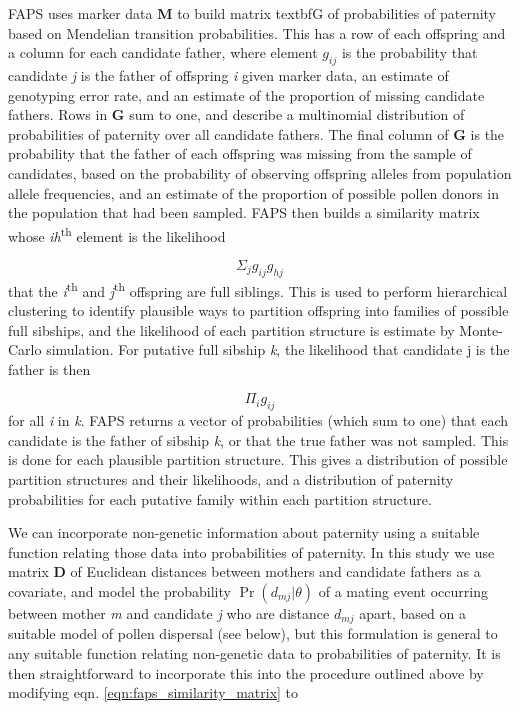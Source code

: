 \documentclass[10pt, a4paper, twocolumn]{article} %
\begin{document}
FAPS uses marker data \textbf{M} to build matrix textbf{G} of probabilities of paternity based on Mendelian transition probabilities. This has a row of each offspring and a column for each candidate father, where element $g_{ij}$ is the probability that candidate \textit{j} is the father of offspring \textit{i} given marker data, an estimate of genotyping error rate, and an estimate of the proportion of missing candidate fathers. Rows in \textbf{G} sum to one, and describe a multinomial distribution of probabilities of paternity over all candidate fathers. The final column of \textbf{G} is the probability that the father of each offspring was missing from the sample of candidates, based on the probability of observing offspring alleles from population allele frequencies, and an estimate of the proportion of possible pollen donors in the population that had been sampled. FAPS then builds a similarity matrix whose \textit{ih}\textsuperscript{th} element is the likelihood 

\begin{equation}\label{eqn:faps_similarity_matrix}
\Sigma_j g_{ij}g_{hj}
\end{equation}
that the \textit{i}\textsuperscript{th} and \textit{j}\textsuperscript{th} offspring are full siblings. This is used to perform hierarchical clustering to identify plausible ways to partition offspring into families of possible full sibships, and the likelihood of each partition structure is estimate by Monte-Carlo simulation. For putative full sibship \textit{k}, the likelihood that candidate j is the father is then

\begin{equation}\label{eqn:faps_lik_sibship}
\Pi_i g_{ij}
\end{equation}
for all \textit{i} in \textit{k}. FAPS returns a vector of probabilities (which sum to one) that each candidate is the father of sibship \textit{k}, or that the true father was not sampled. This is done for each plausible partition structure. This gives a distribution of possible partition structures and their likelihoods, and a distribution of paternity probabilities for each putative family within each partition structure.

We can incorporate non-genetic information about paternity using a suitable function relating those data into probabilities of paternity. In this study we use matrix \textbf{D} of Euclidean distances between mothers and candidate fathers as a covariate, and model the probability $\Pr(d_{mj}|\theta)$ of a mating event occurring between mother \textit{m} and candidate \textit{j} who are distance $d_{mj}$ apart, based on a suitable model of pollen dispersal (see below), but this formulation is general to any suitable function relating non-genetic data to probabilities of paternity. It is then straightforward to incorporate this into the procedure outlined above by modifying eqn. \ref{eqn:faps_similarity_matrix} to
\end{document}
